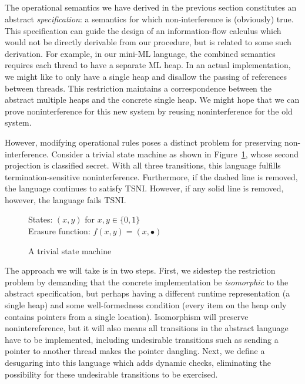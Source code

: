 \subsection{}

The operational semantics we have derived in the previous section
constitutes an abstract \emph{specification}: a semantics for which
non-interference is (obviously) true.  This specification can guide the
design of an information-flow calculus which would not be directly
derivable from our procedure, but is related to some such derivation.
For example, in our mini-ML language, the combined semantics requires
each thread to have a separate ML heap.  In an actual implementation, we
might like to only have a single heap and disallow the passing of
references between threads.  This restriction maintains a correspondence
between the abstract multiple heaps and the concrete single heap.  We might
hope that we can prove noninterference for this new system by reusing
noninterference for the old system.

However, modifying operational rules poses a distinct problem for
preserving non-interference.  Consider a trivial state machine as shown
in Figure~\ref{fig:trivial-sm}, whose second projection is classified
secret.  With all three transitions, this language fulfills
termination-sensitive noninterference.  Furthermore, if the dashed line
is removed, the language continues to satisfy TSNI.  However, if any
solid line is removed, however, the language fails TSNI.

\begin{figure}
    States: $(x,y)$ for $x,y \in \{0,1\}$ \\
    Erasure function: $f(x,y) = (x,\bullet)$

    \begin{center}\end{center}

    \label{fig:trivial-sm}
    \caption{A trivial state machine}
\end{figure}

The approach we will take is in two steps.  First, we sidestep the
restriction problem by demanding that the concrete implementation be
\emph{isomorphic} to the abstract specification, but perhaps having a different
runtime representation (a single heap) and some well-formedness
condition (every item on the heap only contains pointers from a single
location).  Isomorphism will preserve nonintereference, but it will also means all
transitions in the abstract language have to be implemented, including
undesirable transitions such as sending a pointer to another thread makes
the pointer dangling.  Next, we define a desugaring into this language
which adds dynamic checks, eliminating the possibility for these undesirable
transitions to be exercised.

